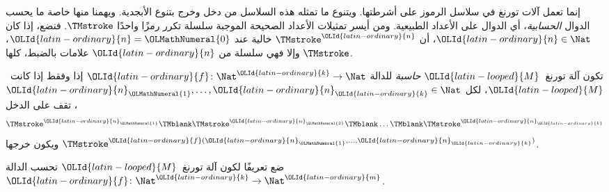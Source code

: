 \documentclass[../../../include/open-logic-section]{subfiles}
\begin{document}

\begin{explain}
إنما تعمل آلات تورنغ في سلاسل الرموز على أشرطتها. ويتنوع ما تمثله هذه السلاسل من دخل وخرج بتنوع الأبجدية. ويهمنا منها خاصة ما يحسب الدوال \emph{الحسابية}، أي الدوال على الأعداد الطبيعية. ومن أيسر تمثيلات الأعداد الصحيحة الموجبة سلسلة تكرر رمزًا واحدًا $\TMstroke$. فنضع، إذا كان $\OLId{latin-ordinary}{n} \in \Nat$، أن $\TMstroke^\OLId{latin-ordinary}{n}$ خالية عند $\OLId{latin-ordinary}{n}=\OLMathNumeral{0}$، وإلا فهي سلسلة من $\OLId{latin-ordinary}{n}$ علامات بالضبط، كلها $\TMstroke$.
\end{explain}

\begin{defn}[الحساب]
تكون آلة تورنغ~$\OLId{latin-looped}{M}$ \emph{حاسبة} للدالة $\OLId{latin-ordinary}{f}\colon\Nat^\OLId{latin-ordinary}{k}\to\Nat$ إذا وفقط إذا كانت~$\OLId{latin-looped}{M}$، لكل $\OLId{latin-ordinary}{n}_\OLMathNumeral{1},\dots,\OLId{latin-ordinary}{n}_\OLId{latin-ordinary}{k}\in\Nat$، تقف على الدخل
\[
\TMstroke^{\OLId{latin-ordinary}{n}_\OLMathNumeral{1}} \TMblank \TMstroke^{\OLId{latin-ordinary}{n}_\OLMathNumeral{2}} \TMblank \dots \TMblank \TMstroke^{\OLId{latin-ordinary}{n}_\OLId{latin-ordinary}{k}}
\]
ويكون خرجها $\TMstroke^{\OLId{latin-ordinary}{f}(\OLId{latin-ordinary}{n}_\OLMathNumeral{1},\dots,\OLId{latin-ordinary}{n}_\OLId{latin-ordinary}{k})}$.
\end{defn}

\begin{prob}
ضع تعريفًا لكون آلة تورنغ~$\OLId{latin-looped}{M}$ تحسب الدالة $\OLId{latin-ordinary}{f}\colon\Nat^\OLId{latin-ordinary}{k}\to\Nat^\OLId{latin-ordinary}{m}$.
\end{prob}
\end{document}
